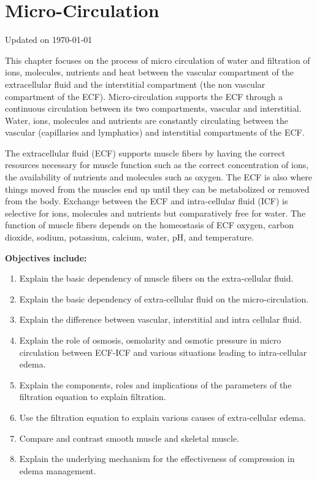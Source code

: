 \chapter{Micro-Circulation}\label{chp:microcirculation}
Updated on \today
\minitoc

This chapter focuses on the process of micro circulation of water and filtration of ions, molecules, nutrients and heat between the vascular compartment of the extracellular fluid and the interstitial compartment (the non vascular compartment of the ECF). Micro-circulation supports the ECF through a continuous circulation between its two compartments, vascular and interstitial. Water, ions, molecules and nutrients are constantly circulating between the vascular (capillaries and lymphatics) and interstitial compartments of the ECF.

The extracellular fluid (ECF) supports muscle fibers by having the correct resources necessary for muscle function such as the correct concentration of ions, the availability of nutrients and molecules such as oxygen. The ECF is also where things moved from the muscles end up until they can be metabolized or removed from the body. Exchange between the ECF and intra-cellular fluid (ICF) is selective for ions, molecules and nutrients but comparatively free for water. The function of muscle fibers depends on the homeostasis of ECF oxygen, carbon dioxide, sodium, potassium, calcium, water, pH, and temperature.

\vspace{5mm}
\begin{svgraybox}
\textbf{Objectives include:}
\begin{enumerate}
    \item Explain the basic dependency of muscle fibers on the extra-cellular fluid.
    \item Explain the basic dependency of extra-cellular fluid on the micro-circulation.
    \item Explain the difference between vascular, interstitial and intra cellular fluid.
    \item Explain the role of osmosis, osmolarity and osmotic pressure in micro circulation between ECF-ICF and various situations leading to intra-cellular edema.
    \item Explain the components, roles and implications of the parameters of the filtration equation to explain filtration.
    \item Use the filtration equation to explain various causes of extra-cellular edema.
    \item Compare and contrast smooth muscle and skeletal muscle.
    \item Explain the underlying mechanism for the effectiveness of compression in edema management.
\end{enumerate}
\end{svgraybox}

